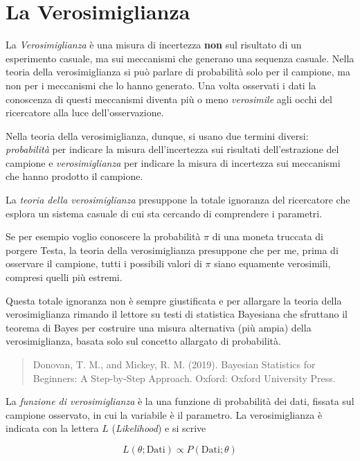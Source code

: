 \documentclass[
  11pt,
]{book}
\theoremstyle{mytheoremstyle}
\theoremstyle{mydefstyle}
\begin{document}
\section{La Verosimiglianza}\label{la-verosimiglianza}

La \emph{Verosimiglianza} è una misura di incertezza \textbf{non} sul risultato di un
esperimento casuale, ma sui meccanismi che generano una sequenza casuale.
Nella teoria della verosimiglianza si può parlare di probabilità solo per il campione,
ma non per i meccanismi che lo hanno generato. Una volta osservati i dati la conoscenza
di questi meccanismi diventa più o meno \emph{verosimile} agli occhi del ricercatore alla
luce dell'osservazione.

Nella teoria della verosimiglianza, dunque, si usano due termini diversi: \emph{probabilità}
per indicare la misura dell'incertezza sui risultati dell'estrazione del campione e
\emph{verosimiglianza} per indicare la misura di incertezza sui meccanismi che hanno prodotto il
campione.

La \emph{teoria della verosimiglianza} presuppone la totale ignoranza del ricercatore
che esplora un sistema casuale di cui sta cercando di comprendere i parametri.

Se per esempio voglio conoscere la probabilità \(\pi\) di una moneta truccata di
porgere Testa, la teoria della verosimiglianza presuppone che per me,
prima di osservare il campione, tutti i possibili valori di \(\pi\) siano
equamente verosimili, compresi quelli più estremi.

Questa totale ignoranza non è sempre giustificata e per allargare la teoria della
verosimiglianza rimando il lettore su testi di statistica Bayesiana che sfruttano
il teorema di Bayes per costruire una misura alternativa (più ampia) della
verosimiglianza, basata solo sul concetto allargato di probabilità.

\begin{quote}
Donovan, T. M., and Mickey, R. M. (2019). Bayesian Statistics for Beginners: A Step-by-Step Approach. Oxford: Oxford University Press.
\end{quote}

La \emph{funzione di verosimiglianza} è la una funzione di probabilità dei dati,
fissata sul campione osservato, in cui la variabile è il parametro. La verosimiglianza è
indicata con la lettera \(L\) (\emph{Likelihood}) e si scrive

\begin{info}
\[
L(\theta;\text{Dati})\propto P(\text{Dati};\theta)
\]

\end{info}
\end{document}
